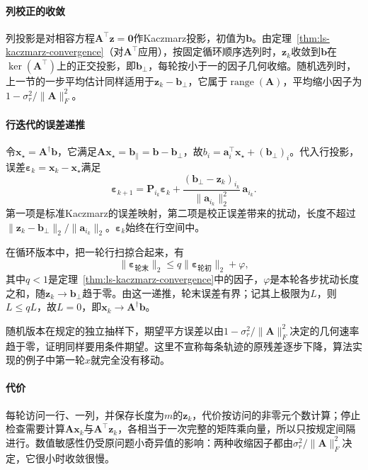\paragraph{列校正的收敛}
列投影是对相容方程$\bm A^\top\bm z=\bm 0$作Kaczmarz投影，初值为$\bm b$。由定理~\ref{thm:ls-kaczmarz-convergence}（对$\bm A^\top$应用），按固定循环顺序选列时，$\bm z_k$收敛到$\bm b$在$\ker(\bm A^\top)$上的正交投影，即$\bm b_\perp$，每轮按小于一的因子几何收缩。随机选列时，上一节的一步平均估计同样适用于$\bm z_k-\bm b_\perp$，它属于$\operatorname{range}(\bm A)$，平均缩小因子为$1-\sigma_r^2/\lVert\bm A\rVert_F^2$。

\paragraph{行迭代的误差递推}
令$\bm x_\star=\bm A^\dagger\bm b$，它满足$\bm A\bm x_\star=\bm b_\parallel=\bm b-\bm b_\perp$，故$b_i=\bm a_i^\top\bm x_\star+(\bm b_\perp)_i$。代入行投影，误差$\bm\varepsilon_k=\bm x_k-\bm x_\star$满足
\begin{equation}
 \bm\varepsilon_{k+1}=\bm P_{i_k}\bm\varepsilon_k+\frac{(\bm b_\perp-\bm z_k)_{i_k}}{\lVert\bm a_{i_k}\rVert_2^2}\,\bm a_{i_k}.
 \label{eq:ls-extended-kaczmarz-error-recursion}
\end{equation}
第一项是标准Kaczmarz的误差映射，第二项是校正误差带来的扰动，长度不超过$\lVert\bm z_k-\bm b_\perp\rVert_2/\lVert\bm a_{i_k}\rVert_2$。$\bm\varepsilon_k$始终在行空间中。

在循环版本中，把一轮行扫掠合起来，有
\begin{equation}
 \lVert\bm\varepsilon_{\text{轮末}}\rVert_2\leq q\lVert\bm\varepsilon_{\text{轮初}}\rVert_2+\varphi ,
 \label{eq:ls-extended-kaczmarz-sweep-bound}
\end{equation}
其中$q<1$是定理~\ref{thm:ls-kaczmarz-convergence}中的因子，$\varphi$是本轮各步扰动长度之和，随$\bm z_k\to\bm b_\perp$趋于零。由这一递推，轮末误差有界；记其上极限为$L$，则$L\leq qL$，故$L=0$，即$\bm x_k\to\bm A^\dagger\bm b$。

随机版本在规定的独立抽样下，期望平方误差以由$1-\sigma_r^2/\lVert\bm A\rVert_F^2$决定的几何速率趋于零，证明同样要用条件期望。这里不宣称每条轨迹的原残差逐步下降，算法实现的例子中第一轮$x$就完全没有移动。

\paragraph{代价}
每轮访问一行、一列，并保存长度为$m$的$\bm z_k$，代价按访问的非零元个数计算；停止检查需要计算$\bm A\bm x_k$与$\bm A^\top\bm z_k$，各相当于一次完整的矩阵乘向量，所以只按规定间隔进行。数值敏感性仍受原问题小奇异值的影响：两种收缩因子都由$\sigma_r^2/\lVert\bm A\rVert_F^2$决定，它很小时收敛很慢。

